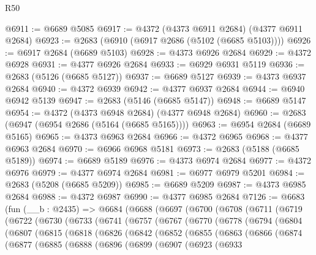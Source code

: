 \begin{lexlean}{R50}
\begin{coremodule}
@6911 := @6689 @5085
@6917 := @4372 (@4373 @6911 @2684) (@4377 @6911 @2684)
@6923 := @2683 (@6910 (@6917 @2686 (@5102 (@6685 @5103))))
@6926 := @6917 @2684 (@6689 @5103)
@6928 := @4373 @6926 @2684
@6929 := @4372 @6928
@6931 := @4377 @6926 @2684
@6933 := @6929 @6931 @5119
@6936 := @2683 (@5126 (@6685 @5127))
@6937 := @6689 @5127
@6939 := @4373 @6937 @2684
@6940 := @4372 @6939
@6942 := @4377 @6937 @2684
@6944 := @6940 @6942 @5139
@6947 := @2683 (@5146 (@6685 @5147))
@6948 := @6689 @5147
@6954 := @4372 (@4373 @6948 @2684) (@4377 @6948 @2684)
@6960 := @2683 (@6947 (@6954 @2686 (@5164 (@6685 @5165))))
@6963 := @6954 @2684 (@6689 @5165)
@6965 := @4373 @6963 @2684
@6966 := @4372 @6965
@6968 := @4377 @6963 @2684
@6970 := @6966 @6968 @5181
@6973 := @2683 (@5188 (@6685 @5189))
@6974 := @6689 @5189
@6976 := @4373 @6974 @2684
@6977 := @4372 @6976
@6979 := @4377 @6974 @2684
@6981 := @6977 @6979 @5201
@6984 := @2683 (@5208 (@6685 @5209))
@6985 := @6689 @5209
@6987 := @4373 @6985 @2684
@6988 := @4372 @6987
@6990 := @4377 @6985 @2684
@7126 := @6683
    (fun (__b : @2435) =>
    @6684
      (@6688
        (@6697
          (@6700
            (@6708
              (@6711
                (@6719
                  (@6722
                    (@6730
                      (@6733
                        (@6741
                          (@6757
                            (@6767
                              (@6770
                                (@6778
                                  (@6794
                                    (@6804
                                      (@6807
                                        (@6815
                                          (@6818
                                            (@6826
                                              (@6842
                                                (@6852
                                                  (@6855
                                                    (@6863
                                                      (@6866
                                                        (@6874
                                                          (@6877
                                                            (@6885
                                                              (@6888
                                                                (@6896
                                                                  (@6899
                                                                    (@6907
                                                                      (@6923
                                                                        (@6933

\end{coremodule}
\end{lexlean}
